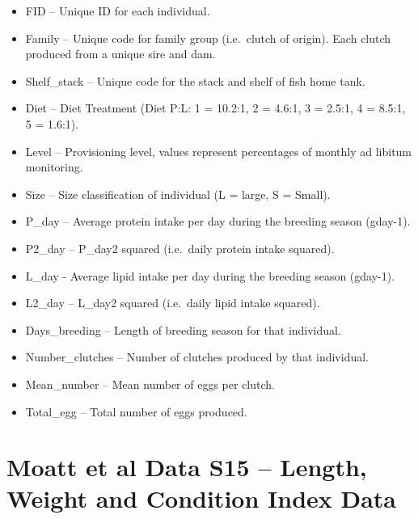 \documentclass[]{book}
\providecommand{\tightlist}{%
  \setlength{\itemsep}{0pt}\setlength{\parskip}{0pt}}
\begin{document}
\begin{itemize}
\tightlist
\item
  FID -- Unique ID for each individual.
\item
  Family -- Unique code for family group (i.e.~clutch of origin). Each clutch produced from a unique sire and dam.
\item
  Shelf\_stack -- Unique code for the stack and shelf of fish home tank.
\item
  Diet -- Diet Treatment (Diet P:L: 1 = 10.2:1, 2 = 4.6:1, 3 = 2.5:1, 4 = 8.5:1, 5 = 1.6:1).
\item
  Level -- Provisioning level, values represent percentages of monthly ad libitum monitoring.
\item
  Size -- Size classification of individual (L = large, S = Small).
\item
  P\_day -- Average protein intake per day during the breeding season (gday-1).
\item
  P2\_day -- P\_day2 squared (i.e.~daily protein intake squared).
\item
  L\_day - Average lipid intake per day during the breeding season (gday-1).
\item
  L2\_day -- L\_day2 squared (i.e.~daily lipid intake squared).
\item
  Days\_breeding -- Length of breeding season for that individual.
\item
  Number\_clutches -- Number of clutches produced by that individual.
\item
  Mean\_number -- Mean number of eggs per clutch.
\item
  Total\_egg -- Total number of eggs produced.
\end{itemize}

\hypertarget{moatt-et-al-data-s15-length-weight-and-condition-index-data}{%
\section{Moatt et al Data S15 -- Length, Weight and Condition Index Data}\label{moatt-et-al-data-s15-length-weight-and-condition-index-data}}
\end{document}
